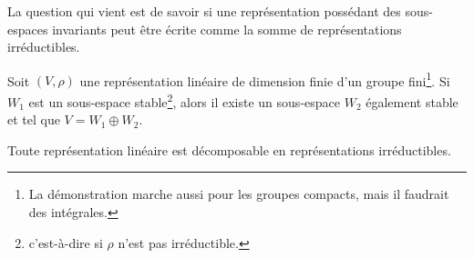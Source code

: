 La question qui vient est de savoir si une représentation possédant des sous-espaces invariants peut être écrite comme la somme de représentations irréductibles.

\begin{proposition} \label{PropHeyoAN}  
	Soit \( (V,\rho)\) une représentation linéaire de dimension finie d'un groupe fini\footnote{La démonstration marche aussi pour les groupes compacts, mais il faudrait des intégrales.}. Si \( W_1\) est un sous-espace stable\footnote{c'est-à-dire si \( \rho\) n'est pas irréductible.}, alors il existe un sous-espace \( W_2\) également stable et tel que \( V=W_1\oplus W_2\).

	Toute représentation linéaire est décomposable en représentations irréductibles.
\end{proposition}

